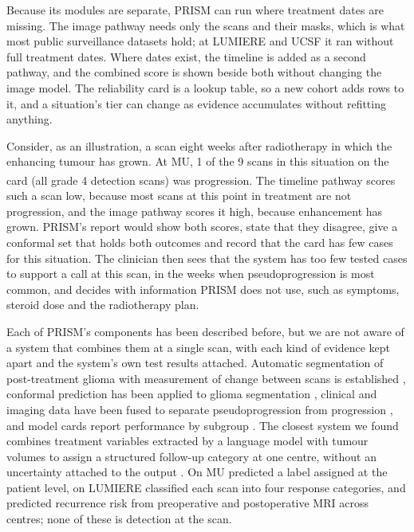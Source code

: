 \documentclass[largeformat]{interact} %
\newcommand{\expl}{\textsuperscript{\textdagger}}
\begin{document}
Because its modules are separate, PRISM can run where treatment dates are missing. The image pathway needs only the scans and
their masks, which is what most public surveillance datasets hold; at LUMIERE and UCSF it ran without full treatment dates. Where dates exist, the timeline is added as a second pathway, and the combined score is shown beside both without changing the image model. The reliability card is a lookup table, so a new cohort adds rows to it, and a situation's tier can
change as evidence accumulates without refitting anything.

Consider, as an illustration, a scan eight weeks after radiotherapy in which the enhancing tumour has grown. At MU, 1
of the 9 scans in this situation on the card (all grade 4 detection scans) was progression\expl. The timeline pathway scores such a scan
low, because most scans at this point in treatment are not progression, and the image pathway scores it high, because
enhancement has grown. PRISM's report would show both scores, state that they disagree, give a conformal set that
holds both outcomes and record that the card has few cases for this situation. The clinician then sees that the
system has too few tested cases to support a call at this scan, in the weeks when pseudoprogression is most common, and decides
with information PRISM does not use, such as symptoms, steroid dose and the radiotherapy plan.

Each of PRISM's components has been described before, but we are not aware of a system that combines them at a
single scan, with each kind of evidence kept apart and the system's own test results attached.
Automatic segmentation of post-treatment glioma with measurement of change between scans is established
\citep{rudie2022}, conformal prediction has been applied to glioma segmentation \citep{elyassirad2025}, clinical and
imaging data have been fused to separate pseudoprogression from progression \citep{gomaa2025}, and model cards report
performance by subgroup \citep{mitchell2019}. The closest system we found combines treatment variables extracted by a
language model with tumour volumes to assign a structured follow-up category at one centre, without an uncertainty
attached to the output \citep{jabal2026}. On MU \citet{christodoulou2026} predicted a label assigned at the patient level, on LUMIERE  classified each scan into four response categories, and
\citet{chen2026} predicted recurrence risk from preoperative and postoperative MRI across centres; none of these is
detection at the scan.
\end{document}
